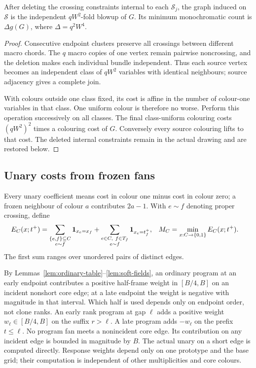 \begin{lemma}\label{lem:source-amplification}
After deleting the crossing constraints internal to each $\mathcal S_j$, the graph induced on $\mathcal S$ is the independent $qW^2$-fold blowup of $G$. Its minimum monochromatic count is $\Delta g(G)$, where $\Delta=q^2W^4$.
\end{lemma}
\begin{proof}
Consecutive endpoint clusters preserve all crossings between different macro chords. The $q$ macro copies of one vertex remain pairwise noncrossing, and the deletion makes each individual bundle independent. Thus each source vertex becomes an independent class of $qW^2$ variables with identical neighbours; source adjacency gives a complete join.

With colours outside one class fixed, its cost is affine in the number of colour-one variables in that class. One uniform colour is therefore no worse. Perform this operation successively on all classes. The final class-uniform colouring costs $(qW^2)^2$ times a colouring cost of $G$. Conversely every source colouring lifts to that cost. The deleted internal constraints remain in the actual drawing and are restored below.
\end{proof}

\subsection{Unary costs from frozen fans}
Every unary coefficient means cost in colour one minus cost in colour zero; a frozen neighbour of colour $a$ contributes $2a-1$. With $e\sim f$ denoting proper crossing, define
\begin{align}
E_C(x;t^+)
&=\sum_{\substack{\{e,f\}\subseteq C\\e\sim f}}\mathbf 1_{x_e=x_f}
+\sum_{\substack{e\in C,\ f\in T_f\\e\sim f}}\mathbf 1_{x_e=t_f^+},
&
M_C&=\min_{x:C\to\{0,1\}}E_C(x;t^+).
\label{eq:core-energy}
\end{align}
The first sum ranges over unordered pairs of distinct edges.

By Lemmas~\ref{lem:ordinary-table}--\ref{lem:soft-fields}, an ordinary program at an early endpoint contributes a positive half-frame weight in $[B/4,B]$ on an incident nonshort core edge; at a late endpoint the weight is negative with magnitude in that interval. Which half is used depends only on endpoint order, not clone ranks. An early rank program at gap $\ell$ adds a positive weight $w_\ell\in[B/4,B]$ on the suffix $r>\ell$. A late program adds $-w_\ell$ on the prefix $t\leq\ell$. No program fan meets a nonincident core edge. Its contribution on any incident edge is bounded in magnitude by $B$. The actual unary on a short edge is computed directly. Response weights depend only on one prototype and the base grid; their computation is independent of other multiplicities and core colours.

